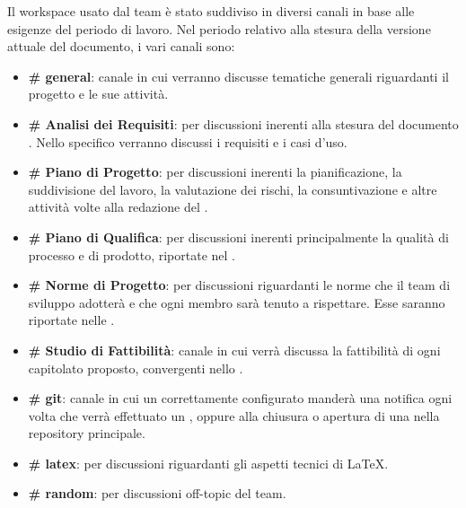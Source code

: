 			Il workspace usato dal team è stato suddiviso in diversi canali in base alle esigenze del periodo di lavoro.
			Nel periodo relativo alla stesura della versione attuale del documento, i vari canali sono:
			\begin{itemize}
				\item \textbf{\# general}: canale in cui verranno discusse tematiche generali riguardanti il progetto e le sue attività.
				\item \textbf{\# Analisi dei Requisiti}: per discussioni inerenti alla stesura del documento \AdR. Nello specifico verranno discussi i requisiti e i casi d'uso.
				\item \textbf{\# Piano di Progetto}: per discussioni inerenti la pianificazione, la suddivisione del lavoro, la valutazione dei rischi, la consuntivazione e altre attività volte alla redazione del \PdP.
				\item \textbf{\# Piano di Qualifica}: per discussioni inerenti principalmente la qualità di processo e di prodotto, riportate nel \PdQ.
				\item \textbf{\# Norme di Progetto}: per discussioni riguardanti le norme che il team di sviluppo adotterà e che ogni membro sarà tenuto a rispettare. Esse saranno riportate nelle \NdP.
				\item \textbf{\# Studio di Fattibilità}: canale in cui verrà discussa la fattibilità di ogni capitolato proposto, convergenti nello \SdF.
				\item \textbf{\# git}: canale in cui un  correttamente configurato manderà una notifica ogni volta che verrà effettuato un , oppure alla chiusura o apertura di una  nella repository principale.
				\item \textbf{\# latex}: per discussioni riguardanti gli aspetti tecnici di \LaTeX.
				\item \textbf{\# random}: per discussioni off-topic del team. %
			\end{itemize}

